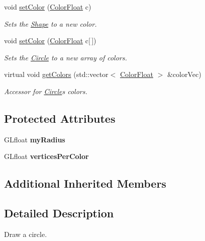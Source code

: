 \begin{DoxyCompactItemize}
void \hyperlink{classtsgl_1_1_circle_a3e97ff653a534a606f0a3b3176c330b0}{set\+Color} (\hyperlink{structtsgl_1_1_color_float}{Color\+Float} c)
\begin{DoxyCompactList}\small\item\em Sets the \hyperlink{classtsgl_1_1_shape}{Shape} to a new color. \end{DoxyCompactList}\item 
void \hyperlink{classtsgl_1_1_circle_aa25c336d07fb8216bd5d6f63f53a2271}{set\+Color} (\hyperlink{structtsgl_1_1_color_float}{Color\+Float} c\mbox{[}$\,$\mbox{]})
\begin{DoxyCompactList}\small\item\em Sets the \hyperlink{classtsgl_1_1_circle}{Circle} to a new array of colors. \end{DoxyCompactList}\item 
virtual void \hyperlink{classtsgl_1_1_circle_af0e1ef7313bde5f66750b616de296f76}{get\+Colors} (std\+::vector$<$ \hyperlink{structtsgl_1_1_color_float}{Color\+Float} $>$ \&color\+Vec)
\begin{DoxyCompactList}\small\item\em Accessor for \hyperlink{classtsgl_1_1_circle}{Circle}\textquotesingle{}s colors. \end{DoxyCompactList}\end{DoxyCompactItemize}
\subsection*{Protected Attributes}
\begin{DoxyCompactItemize}
\item 
\mbox{\label{classtsgl_1_1_circle_a60107a7f25bc0216daf628e24264a7a5}} 
G\+Lfloat {\bfseries my\+Radius}
\item 
\mbox{\label{classtsgl_1_1_circle_a513d9c5e6e8b7b32c2e10756835a1612}} 
G\+Lfloat {\bfseries vertices\+Per\+Color}
\end{DoxyCompactItemize}
\subsection*{Additional Inherited Members}


\subsection{Detailed Description}
Draw a circle. 

